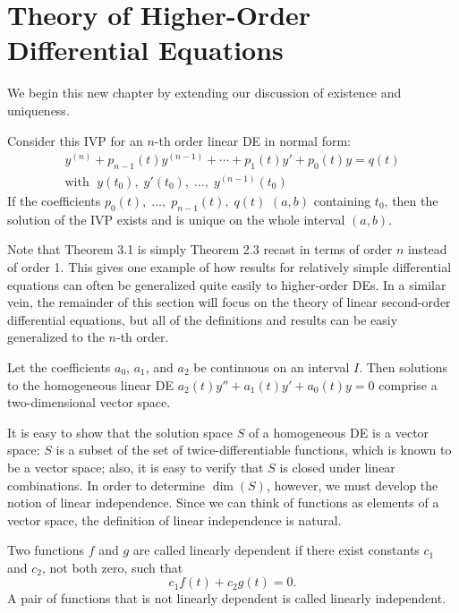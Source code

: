 \documentclass[../m82main.tex]{chapters}
\begin{document}
\section{Theory of Higher-Order Differential Equations}
We begin this new chapter by extending our discussion of existence and uniqueness.

\begin{theorem}
    Consider this IVP for an $n$-th order linear DE in normal form:
    \begin{gather*}
        y^{(n)} + p_{n-1}(t)y^{(n-1)} + \cdots + p_1(t)y' + p_0(t)y = q(t) \\
        \text{with }\; y(t_0),\; y'(t_0),\; \ldots,\; y^{(n-1)}(t_0)
    \end{gather*}
    If the coefficients $p_0(t),\; \ldots,\; p_{n-1}(t),\; q(t)$  $(a, b)$ containing $t_0$, then the solution of the IVP exists and is unique on the whole interval $(a, b)$.
\end{theorem}

Note that Theorem 3.1 is simply Theorem 2.3 recast in terms of order $n$ instead of order 1.
This gives one example of how results for relatively simple differential equations can often be generalized quite easily to higher-order DEs.
In a similar vein, the remainder of this section will focus on the theory of linear second-order differential equations, but all of the definitions and results can be easiy generalized to the $n$-th order.

\begin{theorem}
    Let the coefficients $a_0$, $a_1$, and $a_2$ be continuous on an interval $I$.
    Then solutions to the homogeneous linear DE $a_2(t)y'' + a_1(t)y' + a_0(t)y = 0$ comprise a two-dimensional vector space.
\end{theorem}

It is easy to show that the solution space $S$ of a homogeneous DE is a vector space: $S$ is a subset of the set of twice-differentiable functions, which is known to be a vector space; also, it is easy to verify that $S$ is closed under linear combinations.
In order to determine $\dim (S)$, however, we must develop the notion of linear independence.
Since we can think of functions as elements of a vector space, the definition of linear independence is natural.

\begin{definition}
    Two functions $f$ and $g$ are called linearly dependent if there exist constants $c_1$ and $c_2$, not both zero, such that
    \[ c_1f(t) + c_2g(t) = 0. \]
    A pair of functions that is not linearly dependent is called linearly independent.
\end{definition}
\end{document}
